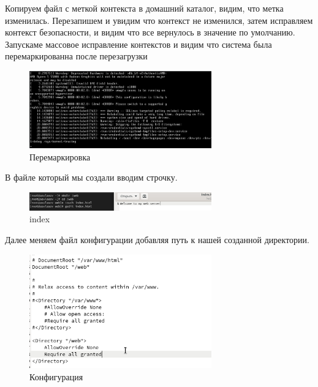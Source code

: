 \documentclass[
  12pt,
  a4paper,
  DIV=11,
  numbers=noendperiod]{scrreprt}
\begin{document}
Копируем файл с меткой контекста в домашний каталог, видим, что метка
изменилась. Перезапишем и увидим что контекст не изменился, затем
исправляем контекст безопасности, и видим что все вернулось в значение
по умолчанию. Запускаме массовое исправление контекстов и видим что
система была перемаркированна после перезагрузки

\begin{figure}

{\centering \includegraphics[width=0.7\textwidth,height=\textheight]{image/6.png}

}

\caption{Перемаркировка}

\end{figure}%

В файле который мы создали вводим строчку.

\begin{figure}

{\centering \includegraphics[width=0.7\textwidth,height=\textheight]{image/7.png}

}

\caption{index}

\end{figure}%

Далее меняем файл конфигурации добавляя путь к нашей созданной
директории.

\begin{figure}

{\centering \includegraphics[width=0.7\textwidth,height=\textheight]{image/8.png}

}

\caption{Конфигурация}

\end{figure}%
\end{document}
